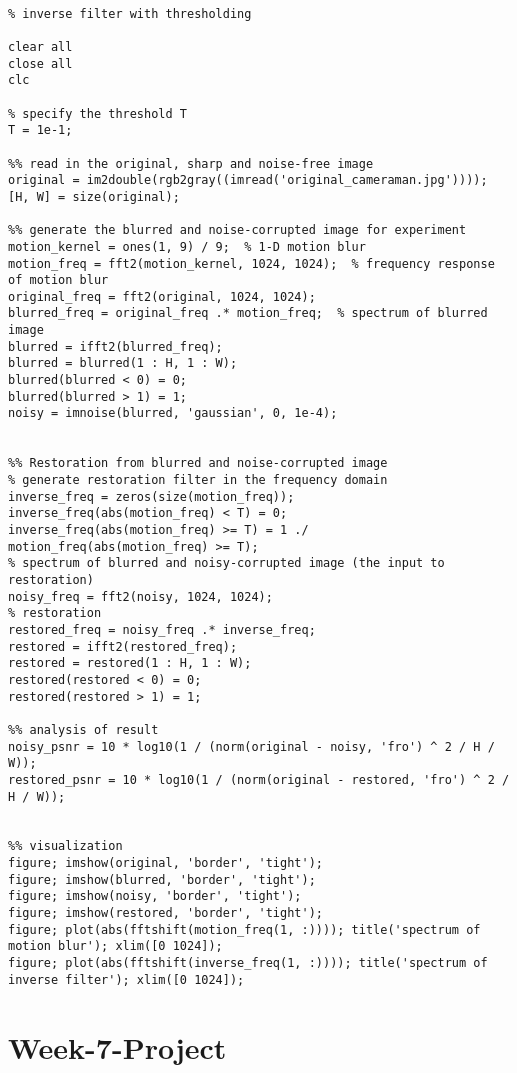 \documentclass[12 pt]{article}
\begin{document}
 
 \begin{lstlisting}
 
% inverse filter with thresholding

clear all
close all
clc

% specify the threshold T
T = 1e-1;

%% read in the original, sharp and noise-free image
original = im2double(rgb2gray((imread('original_cameraman.jpg'))));
[H, W] = size(original);

%% generate the blurred and noise-corrupted image for experiment
motion_kernel = ones(1, 9) / 9;  % 1-D motion blur
motion_freq = fft2(motion_kernel, 1024, 1024);  % frequency response of motion blur
original_freq = fft2(original, 1024, 1024);
blurred_freq = original_freq .* motion_freq;  % spectrum of blurred image
blurred = ifft2(blurred_freq);
blurred = blurred(1 : H, 1 : W);
blurred(blurred < 0) = 0;
blurred(blurred > 1) = 1;
noisy = imnoise(blurred, 'gaussian', 0, 1e-4);


%% Restoration from blurred and noise-corrupted image
% generate restoration filter in the frequency domain
inverse_freq = zeros(size(motion_freq));
inverse_freq(abs(motion_freq) < T) = 0;
inverse_freq(abs(motion_freq) >= T) = 1 ./ motion_freq(abs(motion_freq) >= T);
% spectrum of blurred and noisy-corrupted image (the input to restoration)
noisy_freq = fft2(noisy, 1024, 1024);
% restoration
restored_freq = noisy_freq .* inverse_freq;
restored = ifft2(restored_freq);
restored = restored(1 : H, 1 : W);
restored(restored < 0) = 0;
restored(restored > 1) = 1;

%% analysis of result
noisy_psnr = 10 * log10(1 / (norm(original - noisy, 'fro') ^ 2 / H / W));
restored_psnr = 10 * log10(1 / (norm(original - restored, 'fro') ^ 2 / H / W));


%% visualization
figure; imshow(original, 'border', 'tight');
figure; imshow(blurred, 'border', 'tight');
figure; imshow(noisy, 'border', 'tight');
figure; imshow(restored, 'border', 'tight');
figure; plot(abs(fftshift(motion_freq(1, :)))); title('spectrum of motion blur'); xlim([0 1024]);
figure; plot(abs(fftshift(inverse_freq(1, :)))); title('spectrum of inverse filter'); xlim([0 1024]);
 \end{lstlisting}
 



 \newpage
 \section{Week-7-Project}
 
\end{document}
